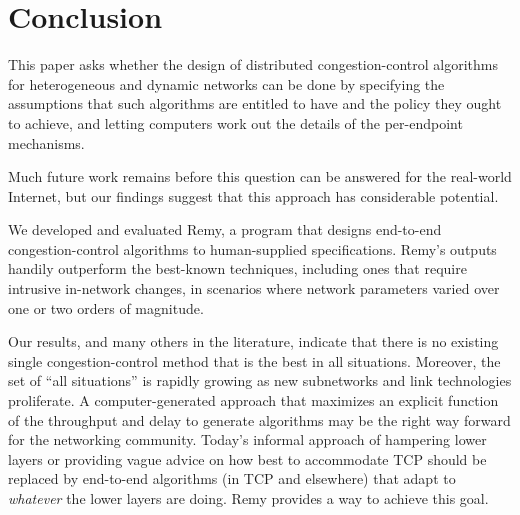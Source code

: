 \section{Conclusion}
\label{s:concl}

This paper asks whether the design of distributed congestion-control
algorithms for heterogeneous and dynamic networks can be done by
specifying the assumptions that such algorithms are entitled to have
and the policy they ought to achieve, and letting computers work out
the details of the per-endpoint mechanisms.

Much future work remains before this question can be answered for
the real-world Internet, but our findings suggest that this approach
has considerable potential.

We developed and evaluated Remy, a program that designs end-to-end
congestion-control algorithms to human-supplied specifications. Remy's
outputs handily outperform the best-known techniques, including ones
that require intrusive in-network changes, in scenarios where network
parameters varied over one or two orders of magnitude.

Our results, and many others in the literature, indicate that there is
no existing single congestion-control method that is the best in all
situations. Moreover, the set of ``all situations'' is rapidly growing
as new subnetworks and link technologies proliferate.  A
computer-generated approach that maximizes an explicit function of the
throughput and delay to generate algorithms may be the right way
forward for the networking community.  Today's informal approach of
hampering lower layers or providing vague advice on how best to
accommodate TCP should be replaced by end-to-end algorithms (in TCP
and elsewhere) that adapt to {\em whatever} the lower layers are
doing.  Remy provides a way to achieve this goal.
